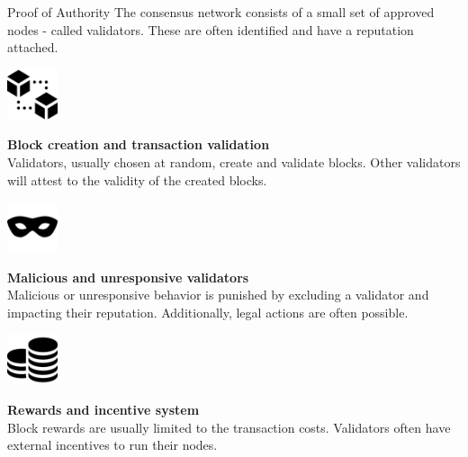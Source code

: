 \documentclass[]{beamer}
\begin{document}
	\begin{frame}{Proof of Authority}
		\small
		The consensus network consists of a \color{focus}small set of approved nodes \color{black} - called validators. These are often identified and have a reputation attached.
		
		\pause
		\vspace{1.5 em}
		\begin{minipage}{0.2\textwidth}
			\begin{center}
				\includegraphics[height=4em]{../assets/images/blocks}
			\end{center}
		\end{minipage}
		\begin{minipage}{0.7\textwidth}
			\textbf{Block creation and transaction validation} \\
			Validators, usually chosen at random, create and validate blocks. Other validators will attest to the validity of the created blocks.
		\end{minipage}
		
		\pause
		\vspace{1.5 em}
		\begin{minipage}{0.2\textwidth}
			\begin{center}
				\includegraphics[height=4em]{../assets/images/mask}
			\end{center}
		\end{minipage}
		\begin{minipage}{0.7\textwidth}
			\textbf{Malicious and unresponsive validators} \\
			Malicious or unresponsive behavior is punished by excluding a validator and impacting their reputation. Additionally, legal actions are often possible.
		\end{minipage}
		
		\pause
		\vspace{1.5 em}
		\begin{minipage}{0.2\textwidth}
			\begin{center}
				\includegraphics[height=4em]{../assets/images/coin-stack}
			\end{center}
		\end{minipage}
		\begin{minipage}{0.7\textwidth}
			\textbf{Rewards and incentive system} \\
			Block rewards are usually limited to the transaction costs. Validators often have external incentives to run their nodes.
		\end{minipage}
	\end{frame}
	
\end{document}
